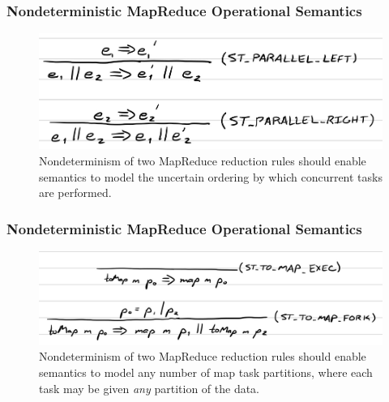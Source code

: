 \begin{frame}
  \frametitle{Nondeterministic MapReduce Operational Semantics}
  \begin{figure}
    \includegraphics[scale=0.33]{img/ST_PARALLEL.jpeg}
    \caption{Nondeterminism of two MapReduce reduction rules should enable
             semantics to model the uncertain ordering by which concurrent tasks
             are performed.}
  \end{figure}
\end{frame}

\begin{frame}
  \frametitle{Nondeterministic MapReduce Operational Semantics}
  \begin{figure}
    \includegraphics[scale=0.25]{img/ST_TO_MAP.jpeg}
    \caption{Nondeterminism of two MapReduce reduction rules should enable
             semantics to model any number of map task partitions, where each
             task may be given \emph{any} partition of the data.}
  \end{figure}
\end{frame}
